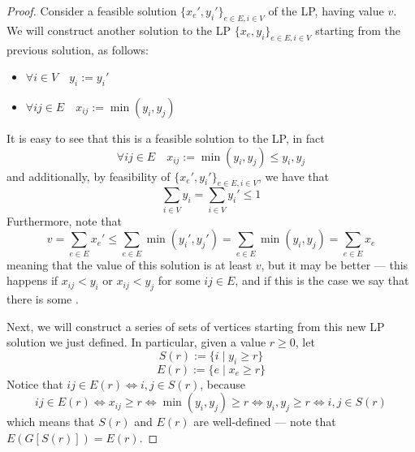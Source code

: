 \documentclass[a4paper, 12pt]{report}
\begin{document}
    \begin{proof}
        Consider a feasible solution $\{x_e', y_i'\}_{e \in E, i \in V}$ of the LP, having value $v$. We will construct another solution to the LP $\{x_e, y_i\}_{e \in E, i \in V}$ starting from the previous solution, as follows:

        \begin{itemize}
            \item $\forall i \in V \quad y_i := y_i'$
            \item $\forall ij \in E \quad x_{ij} := \min(y_i, y_j)$
        \end{itemize}

        It is easy to see that this is a feasible solution to the LP, in fact $$\forall ij \in E \quad x_{ij} := \min(y_i, y_j) \le y_i, y_j$$ and additionally, by feasibility of $\{x_e', y_i'\}_{e \in E, i \in V}$, we have that $$\sum_{i \in V}{y_i} = \sum_{i \in V}{y_i'} \le 1$$ Furthermore, note that $$v = \sum_{e \in E}{x_e'} \le \sum_{e \in E}{\min(y_i', y_j')} = \sum_{e \in E}{\min(y_i, y_j)} = \sum_{e \in E}{x_e}$$ meaning that the value of this solution is at least $v$, but it may be better --- this happens if $x_{ij} < y_i$ or $x_{ij} < y_j$ for some $ij \in E$, and if this is the case we say that there is some .

        Next, we will construct a series of sets of vertices starting from this new LP solution we just defined. In particular, given a value $r \ge 0$, let $$S(r) := \{i \mid y_i \ge r\}$$ $$E(r) := \{e \mid x_e \ge r\}$$ Notice that $ij \in E(r) \iff i, j \in S(r)$, because $$ij \in E(r) \iff x_{ij} \ge r \iff \min(y_i, y_j) \ge r \iff y_i, y_j \ge r \iff i,j \in S(r)$$ which means that $S(r)$ and $E(r)$ are well-defined --- note that $E(G[S(r)]) = E(r)$.

\end{proof}
\end{document}
